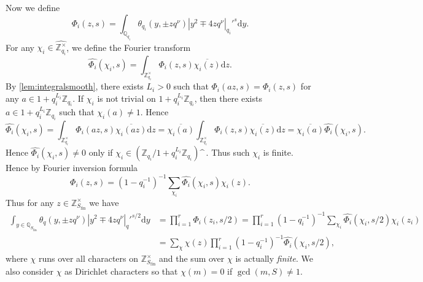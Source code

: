 \documentclass[10pt,oneside,reqno]{amsart}
\makeatletter
\newcommand\rmd{\mathrm{d}}
\newcommand\QQ{\mathbb{Q}}
\newcommand\ZZ{\mathbb{Z}}
\newcommand\fin{\mathrm{fin}}
\theoremstyle{THEOREM}
\theoremstyle{DEFINITION}
\theoremstyle{EXERCISE}
\numberwithin{equation}{section}
\renewenvironment{proof}[1][\proofname]{\par
  \vspace{-6pt}
  \pushQED{\qed}
  \normalfont \topsep6\p@\@plus6\p@\relax
  \trivlist
  \item[\hskip\labelsep\rmfamily\bfseries
    #1\@addpunct{:}]\ignorespaces
}{
  \popQED\endtrivlist\@endpefalse
  \vspace{-6pt}
}
\makeatother
\begin{document}
\begin{proof}
Now we define 
\[
\Phi_i(z,s)=\int_{\QQ_{q_i}}\theta_{q_i}(y,\pm z q^\nu)|y^2\mp 4zq^\nu|_{q_i}'^{s}\rmd y.
\]
For any $\chi_i\in \widehat{\ZZ_{q_i}^\times}$, we define the Fourier transform
\[
\widehat{\Phi_i}(\chi_i,s)=\int_{\ZZ_{q_i}^\times}\Phi_i(z,s)\overline{\chi_i(z)}\rmd z.
\]
By \autoref{lem:integralsmooth}, there exists $L_i>0$ such that $\Phi_i(az,s)=\Phi_i(z,s)$ for any $a\in 1+q_i^{L_i}\ZZ_{q_i}$. If $\chi_i$ is not trivial on $1+q_i^{L_i}\ZZ_{q_i}$, then there exists $a\in 1+q_i^{L_i}\ZZ_{q_i}$ such that $\chi_i(a)\neq 1$. Hence
\[
\widehat{\Phi_i}(\chi_i,s)=\int_{\ZZ_{q_i}^\times}\Phi_i(az,s)\overline{\chi_i(az)}\rmd z=\overline{\chi_i(a)}\int_{\ZZ_{q_i}^\times}\Phi_i(z,s)\overline{\chi_i(z)}\rmd z=\overline{\chi_i(a)}\widehat{\Phi_i}(\chi_i,s).
\]
Hence $\widehat{\Phi_i}(\chi_i,s)\neq 0$ only if $\chi_i\in (\ZZ_{q_i}/1+q_i^{L_i}\ZZ_{q_i})\sphat\,$. Thus such $\chi_i$ is finite. Hence by Fourier inversion formula
\[
\Phi_i(z,s)=(1-q_i^{-1})^{-1}\sum_{\chi_i}\widehat{\Phi_i}(\chi_i,s)\chi_i(z).
\] 
Thus for any $z\in \ZZ_{S_\fin}^\times$ we have
\begin{align*}
\int_{y\in\QQ_{S_\fin}}\theta_{q}(y,\pm zq^\nu)|y^2\mp 4zq^\nu|_q'^{s/2}\rmd y&=\prod_{i=1}^{r}\Phi_i(z_i, s/2)=\prod_{i=1}^{r}(1-q_i^{-1})^{-1}\sum_{\chi_i}\widehat{\Phi_i}(\chi_i,s/2) \chi_i(z_i)\\
&=\sum_{\chi}\chi(z)\prod_{i=1}^{r}(1-q_i^{-1})^{-1}\widehat{\Phi_i} (\chi_i,s/2),
\end{align*}
where $\chi$ runs over all characters on $\ZZ_{S_\fin}^\times$ and the sum over $\chi$ is actually \emph{finite}. We also consider $\chi$ as Dirichlet characters so that $\chi(m)=0$ if $\gcd(m,S)\neq 1$.


\end{proof}
\end{document}
